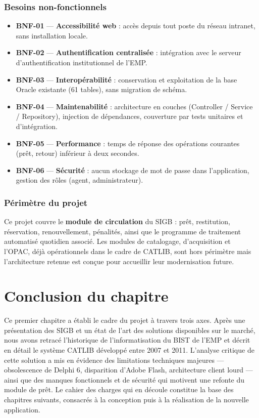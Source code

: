 \subsubsection{Besoins non-fonctionnels}

\begin{itemize}
    \item \textbf{BNF-01} — \textbf{Accessibilité web} : accès depuis tout
    poste du réseau intranet, sans installation locale.
    \item \textbf{BNF-02} — \textbf{Authentification centralisée} : intégration
    avec le serveur d'authentification institutionnel de l'EMP.
    \item \textbf{BNF-03} — \textbf{Interopérabilité} : conservation et
    exploitation de la base Oracle existante (61 tables), sans migration
    de schéma.
    \item \textbf{BNF-04} — \textbf{Maintenabilité} : architecture en couches
    (Controller / Service / Repository), injection de dépendances, couverture
    par tests unitaires et d'intégration.
    \item \textbf{BNF-05} — \textbf{Performance} : temps de réponse des
    opérations courantes (prêt, retour) inférieur à deux secondes.
    \item \textbf{BNF-06} — \textbf{Sécurité} : aucun stockage de mot de passe
    dans l'application, gestion des rôles (agent, administrateur).
\end{itemize}

\subsubsection{Périmètre du projet}

Ce projet couvre le \textbf{module de circulation} du SIGB : prêt,
restitution, réservation, renouvellement, pénalités, ainsi que le programme
de traitement automatisé quotidien associé. Les modules de catalogage,
d'acquisition et l'OPAC, déjà opérationnels dans le cadre de CATLIB,
sont hors périmètre mais l'architecture retenue est conçue pour accueillir
leur modernisation future.

\section*{Conclusion du chapitre}

Ce premier chapitre a établi le cadre du projet à travers trois axes.
Après une présentation des SIGB et un état de l'art des solutions disponibles
sur le marché, nous avons retracé l'historique de l'informatisation du BIST
de l'EMP et décrit en détail le système CATLIB développé entre 2007 et 2011.
L'analyse critique de cette solution a mis en évidence des limitations
techniques majeures — obsolescence de Delphi 6, disparition d'Adobe Flash,
architecture client lourd — ainsi que des manques fonctionnels et de sécurité
qui motivent une refonte du module de prêt. Le cahier des charges qui en découle
constitue la base des chapitres suivants, consacrés à la conception puis à la
réalisation de la nouvelle application.